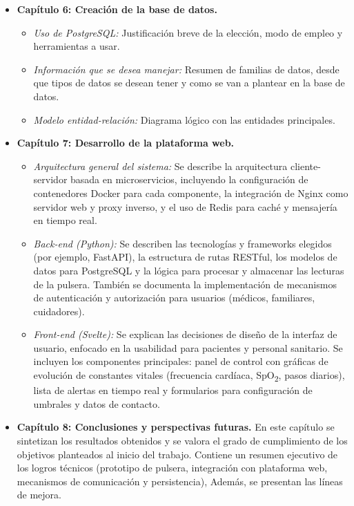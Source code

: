 \documentclass[12pt, a4paper]{article}
\begin{document}
\begin{itemize}
		\item \textbf{Capítulo 6: Creación de la base de datos.}
		\begin{itemize}
			\item \emph{Uso de PostgreSQL:} Justificación breve de la elección, modo de empleo y herramientas a usar.
			\item \emph{Información que se desea manejar:} Resumen de familias de datos, desde que tipos de datos se desean tener y como se van a plantear en la base de datos.
			\item \emph{Modelo entidad-relación:} Diagrama lógico con las entidades principales.
		\end{itemize}
		
		\item \textbf{Capítulo 7: Desarrollo de la plataforma web.}  
		\begin{itemize}
			\item \emph{Arquitectura general del sistema:} Se describe la arquitectura cliente-servidor basada en microservicios, incluyendo la configuración de contenedores Docker para cada componente, la integración de Nginx como servidor web y proxy inverso, y el uso de Redis para caché y mensajería en tiempo real.
			\item \emph{Back-end (Python):} Se describen las tecnologías y frameworks elegidos (por ejemplo, FastAPI), la estructura de rutas RESTful, los modelos de datos para PostgreSQL y la lógica para procesar y almacenar las lecturas de la pulsera. También se documenta la implementación de mecanismos de autenticación y autorización para usuarios (médicos, familiares, cuidadores).  
			\item \emph{Front-end (Svelte):} Se explican las decisiones de diseño de la interfaz de usuario, enfocado en la usabilidad para pacientes y personal sanitario. Se incluyen los componentes principales: panel de control con gráficas de evolución de constantes vitales (frecuencia cardíaca, SpO\textsubscript{2}, pasos diarios), lista de alertas en tiempo real y formularios para configuración de umbrales y datos de contacto.  
		\end{itemize}
		
		\item \textbf{Capítulo 8: Conclusiones y perspectivas futuras.}  
		En este capítulo se sintetizan los resultados obtenidos y se valora el grado de cumplimiento de los objetivos planteados al inicio del trabajo. Contiene un resumen ejecutivo de los logros técnicos (prototipo de pulsera, integración con plataforma web, mecanismos de comunicación y persistencia), Además, se presentan las líneas de mejora.
		

\end{itemize}
\end{document}
